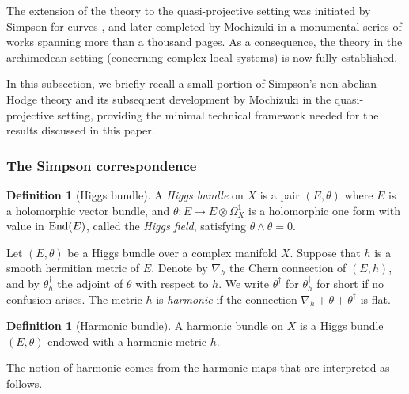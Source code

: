 \documentclass[english]{amsproc}
\theoremstyle{plain}
\theoremstyle{definition}
\newtheorem{dfn}[thm]{Definition}
\theoremstyle{remark}
\theoremstyle{plain}
\numberwithin{equation}{thm} %
\def\db{\bar{\partial}}
\def\End{{\rm \small  End}}
\begin{document}
The extension of the theory to the quasi-projective setting was initiated by Simpson 
for curves \cite{Sim90}, and later completed by Mochizuki 
\cite{Moc06,Moc07,Moc07b} in a monumental series of works spanning more than a 
thousand pages. As a consequence, the theory in the archimedean setting (concerning complex local systems) 
is now fully established.

In this subsection, we briefly recall a small portion of Simpson's non-abelian Hodge theory 
and its subsequent development by Mochizuki in the quasi-projective setting, providing the 
minimal technical framework needed for the results discussed in this paper. 
\subsubsection{The Simpson correspondence} 
\begin{dfn}[Higgs bundle]\label{Higgs}
	A \emph{Higgs bundle} on $X$  is a pair $(E,\theta)$ where $E$ is a holomorphic vector bundle, and $\theta:E\to E\otimes \Omega^1_X$ is a holomorphic one form with value in $\End(E)$, called the \emph{Higgs field},  satisfying $\theta\wedge\theta=0$.
\end{dfn}
Let  $(E,\theta)$ be a Higgs bundle  over a complex manifold $X$.  
Suppose that $h$ is a smooth hermitian metric of $E$.  Denote by $\nabla_h$  the Chern connection of $(E,h)$, and by $\theta^\dagger_h$  the adjoint of $\theta$ with respect to $h$.  We write $\theta^\dagger$ for $\theta^\dagger_h$ for short if no confusion arises.   The metric $h$ is  \emph{harmonic} if the connection  $\nabla_h+\theta+\theta^\dagger$
is flat.
\begin{dfn}[Harmonic bundle] A harmonic bundle on  $X$ is
	a Higgs bundle $(E,\theta)$ endowed with a  harmonic metric $h$.
\end{dfn}
The notion of harmonic comes from the harmonic maps that are interpreted as follows. 
\end{document}
